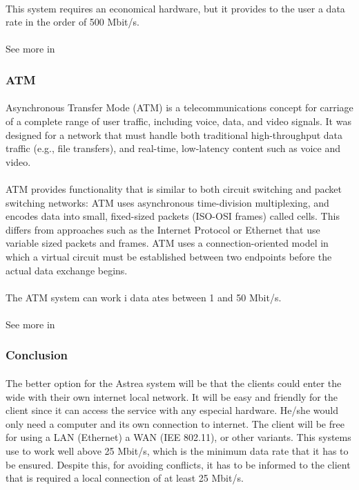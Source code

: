 \paragraph{}
This system requires an economical hardware, but it provides to the user a data rate in the order of 500 Mbit/s.
\paragraph{}
See more in \cite{FrameRelay}

\subsubsection{ATM}
\paragraph{} 
Asynchronous Transfer Mode (ATM) is a telecommunications concept for carriage of a complete range of user traffic, including voice, data, and video signals. It was designed for a network that must handle both traditional high-throughput data traffic (e.g., file transfers), and real-time, low-latency content such as voice and video. 
\paragraph{}
ATM provides functionality that is similar to both circuit switching and packet switching networks: ATM uses asynchronous time-division multiplexing, and encodes data into small, fixed-sized packets (ISO-OSI frames) called cells. This differs from approaches such as the Internet Protocol or Ethernet that use variable sized packets and frames. ATM uses a connection-oriented model in which a virtual circuit must be established between two endpoints before the actual data exchange begins.
\paragraph{}
The ATM system can work i data ates between 1 and 50 Mbit/s.
\paragraph{}
See more in \cite{ATM}

\subsubsection{Conclusion}
\paragraph{}
The better option for the Astrea system will be that the clients could enter the wide with their own internet local network. It will be easy and friendly for the client since it can access the service with any especial hardware. He/she would only need a computer and its own connection to internet. The client will be free for using a LAN (Ethernet) a WAN (IEE 802.11), or other variants. This systems use to work well above 25 Mbit/s, which is the minimum data rate that it has to be ensured. Despite this, for avoiding conflicts, it has to be informed to the client that is required a local connection of at least 25 Mbit/s.
